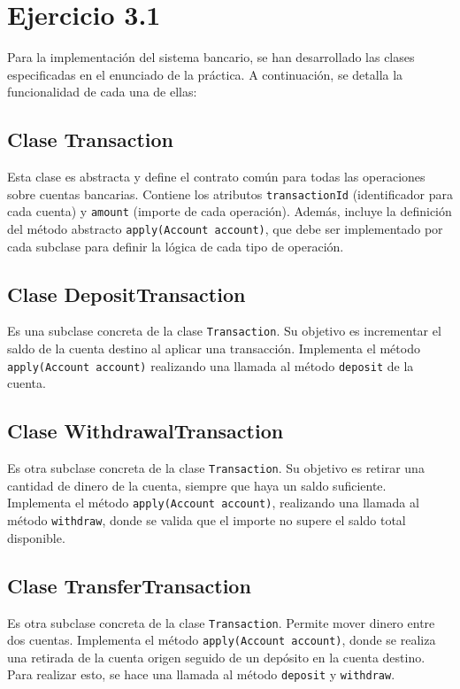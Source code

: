 \documentclass[12pt]{article}
\begin{document}
\section{Ejercicio 3.1}
Para la implementación del sistema bancario, se han desarrollado las clases especificadas en el enunciado de la práctica. A continuación, se detalla la funcionalidad de cada una de ellas:

\subsection{Clase Transaction}
Esta clase es abstracta y define el contrato común para todas las operaciones sobre cuentas bancarias. Contiene los atributos \texttt{transactionId} (identificador para cada cuenta) y \texttt{amount} (importe de cada operación). Además, incluye la definición del método abstracto \texttt{apply(Account account)}, que debe ser implementado por cada subclase para definir la lógica de cada tipo de operación.

\subsection{Clase DepositTransaction}
Es una subclase concreta de la clase \texttt{Transaction}. Su objetivo es incrementar el saldo de la cuenta destino al aplicar una transacción. Implementa el método \texttt{apply(Account account)} realizando una llamada al método \texttt{deposit} de la cuenta.

\subsection{Clase WithdrawalTransaction}
Es otra subclase concreta de la clase \texttt{Transaction}. Su objetivo es retirar una cantidad de dinero de la cuenta, siempre que haya un saldo suficiente. Implementa el método \texttt{apply(Account account)}, realizando una llamada al método \texttt{withdraw}, donde se valida que el importe no supere el saldo total disponible.

\subsection{Clase TransferTransaction}
Es otra subclase concreta de la clase \texttt{Transaction}. Permite mover dinero entre dos cuentas. Implementa el método \texttt{apply(Account account)}, donde se realiza una retirada de la cuenta origen seguido de un depósito en la cuenta destino. Para realizar esto, se hace una llamada al método \texttt{deposit} y \texttt{withdraw}.
\end{document}
